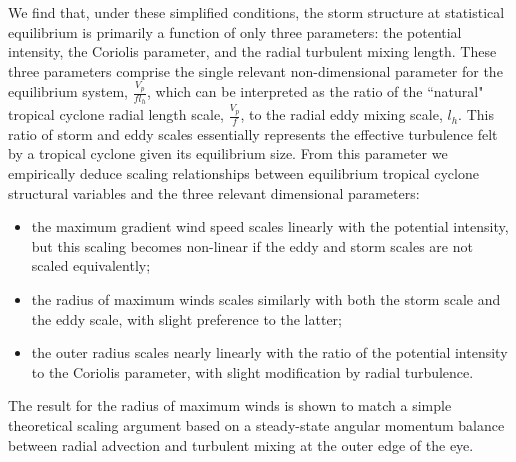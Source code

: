 \documentclass[12pt]{article}
\begin{document}
We find that, under these simplified conditions, the storm structure at statistical equilibrium is primarily a function of only three parameters: the potential intensity, the Coriolis parameter, and the radial turbulent mixing length. These three parameters comprise the single relevant non-dimensional parameter for the equilibrium system, $\frac{V_p}{fl_h}$, which can be interpreted as the ratio of the ``natural" tropical cyclone radial length scale, $\frac{V_p}{f}$, to the radial eddy mixing scale, $l_h$.  This ratio of storm and eddy scales essentially represents the effective turbulence felt by a tropical cyclone given its equilibrium size.  From this parameter we empirically deduce scaling relationships between equilibrium tropical cyclone structural variables and the three relevant dimensional parameters:
\begin{itemize}
	\item the maximum gradient wind speed scales linearly with the potential intensity, but this scaling becomes non-linear if the eddy and storm scales are not scaled equivalently;
	\item the radius of maximum winds scales similarly with both the storm scale and the eddy scale, with slight preference to the latter;
	\item the outer radius scales nearly linearly with the ratio of the potential intensity to the Coriolis parameter, with slight modification by radial turbulence.
\end{itemize}
The result for the radius of maximum winds is shown to match a simple theoretical scaling argument based on a steady-state angular momentum balance between radial advection and turbulent mixing at the outer edge of the eye. 
\end{document}
